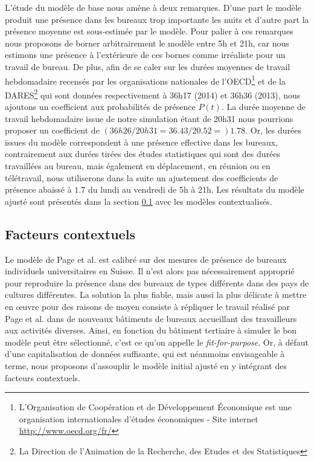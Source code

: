 L'étude du modèle de base nous amène à deux remarques. D'une part le modèle produit une présence dans les bureaux trop importante les nuits et d'autre part la présence moyenne est sous-estimée par le modèle. Pour palier à ces remarques nous proposons de borner arbitrairement le modèle entre 5h et 21h, car nous estimons une présence à l'extérieure de ces bornes comme irréaliste pour un travail de bureau. De plus, afin de se caler sur les durées moyennes de travail hebdomadaire recensés par les organisations nationales de l'OECD\footnote{L'Organisation de Coopération et de Développement Économique est une organisation internationales d'études économiques - Site internet \url{http://www.oecd.org/fr/}} \cite{OECD-14} et de la DARES\footnote{La Direction de l'Animation de la Recherche, des Etudes et des Statistiques} \cite{Pak-13} qui sont données respectivement à 36h17 (2014) et 36h36 (2013), nous ajoutons un coefficient aux probabilités de présence $P(t)$. La durée moyenne de travail hebdomadaire issue de notre simulation étant de 20h31 nous pourrions proposer un coefficient de $(36h26/20h31=36.43/20.52=)1.78 $. Or, les durées issues du modèle correspondent à une présence effective dans les bureaux, contrairement aux durées tirées des études statistiques  qui sont des durées travaillées au bureau, mais également en déplacement, en réunion ou en télétravail, nous utiliserons dans la suite un ajustement des coefficients de présence abaissé à $1.7$ du lundi au vendredi de 5h à 21h. Les résultats du modèle ajusté sont présentés dans la section \ref{Facteurs contextuels} avec les modèles contextualisés.

\subsection{Facteurs contextuels}
\label{Facteurs contextuels}

Le modèle de Page et al.\cite{Page-08} est calibré sur des mesures de présence de bureaux individuels universitaires en Suisse. Il n'est alors pas nécessairement approprié pour reproduire la présence dans des bureaux de types différents dans des pays de cultures différentes. La solution la plus fiable, mais aussi la plus délicate à mettre en œuvre pour des raisons de moyen consiste à répliquer le travail réalisé par Page et al.\cite{Page-08} dans de nouveaux bâtiments de bureaux accueillant des travailleurs aux activités diverses. Ainsi, en fonction du bâtiment tertiaire à simuler le bon modèle peut être sélectionné, c'est ce qu'on appelle le \textit{fit-for-purpose}. Or, à défaut d'une capitalisation de données suffisante, qui est néanmoins envisageable à terme, nous proposons d'assouplir le modèle initial ajusté en y intégrant des facteurs contextuels.


